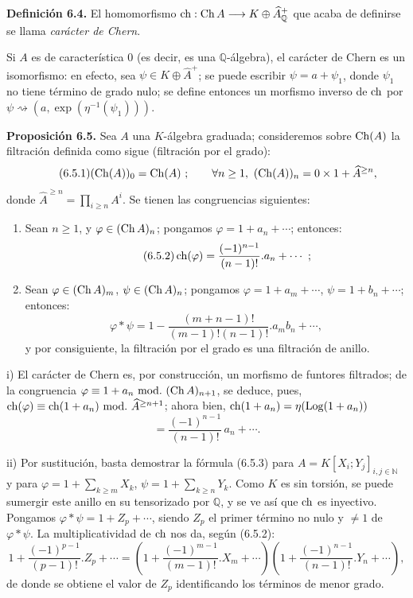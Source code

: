 \textbf{Definición 6.4.} El homomorfismo \(\operatorname{ch}:\operatorname{Ch} A\longrightarrow K\oplus\widehat A_{\mathbb Q}^{+}\) que acaba de definirse se llama \emph{carácter de Chern}.

Si \(A\) es de característica \(0\) (es decir, es una \(\mathbb Q\)-álgebra), el carácter de Chern es un isomorfismo: en efecto, sea \(\psi\in K\oplus\widehat A^+\); se puede escribir \(\psi=a+\psi_1\), donde \(\psi_1\) no tiene término de grado nulo; se define entonces un morfismo inverso de \(\operatorname{ch}\) por \(\psi\rightsquigarrow(a,\exp(\eta^{-1}(\psi_1)))\).

\textbf{Proposición 6.5.} Sea \(A\) una \(K\)-álgebra graduada; consideremos sobre \(\operatorname{Ch}(A)\) la filtración definida como sigue (filtración por el grado):
\begin{equation}\tag{6.5.1}
  (\operatorname{Ch}(A))_0=\operatorname{Ch}(A)~;\qquad
  \forall n\ge1,\ (\operatorname{Ch}(A))_n=0\times 1+\widehat A^{\ge n},
\end{equation}
donde \(\widehat A^{\ge n}=\prod_{i\ge n}A^i\). Se tienen las congruencias siguientes:

\begin{enumerate}[label=\roman*)]
\item Sean \(n\ge1\), y \(\varphi\in(\operatorname{Ch} A)_n\); pongamos \(\varphi=1+a_n+\cdots\); entonces:
\begin{equation}\tag{6.5.2}
  \operatorname{ch}(\varphi)=\frac{(-1)^{n-1}}{(n-1)!}.a_n+\cdots~;
\end{equation}

\item Sean \(\varphi\in(\operatorname{Ch} A)_m\), \(\psi\in(\operatorname{Ch} A)_n\); pongamos
\(\varphi=1+a_m+\cdots\), \(\psi=1+b_n+\cdots\); entonces:
\begin{equation}\tag{6.5.3}
  \varphi*\psi
  =
  1-\frac{(m+n-1)!}{(m-1)!(n-1)!}.a_m b_n+\cdots,
\end{equation}
y por consiguiente, la filtración por el grado es una filtración de anillo.
\end{enumerate}

i) El carácter de Chern es, por construcción, un morfismo de funtores filtrados; de la congruencia \(\varphi\equiv1+a_n\ \mathrm{mod.}\ (\operatorname{Ch} A)_{n+1}\), se deduce, pues, \(\ch(\varphi)\equiv\ch(1+a_n)\ \mathrm{mod.}\ \widehat A^{\ge n+1}\); ahora bien, \(\operatorname{ch}(1+a_n)=\eta(\operatorname{Log}(1+a_n))\)
\[
  =\frac{(-1)^{n-1}}{(n-1)!}\,a_n+\cdots .
\]

ii) Por sustitución, basta demostrar la fórmula (6.5.3) para \(A=K[X_i;Y_j]_{i,j\in\mathbb N}\) y para \(\varphi=1+\sum_{k\ge m}X_k\), \(\psi=1+\sum_{k\ge n}Y_k\). Como \(K\) es sin torsión, se puede sumergir este anillo en su tensorizado por \(\mathbb Q\), y se ve así que \(\operatorname{ch}\) es inyectivo. Pongamos \(\varphi*\psi=1+Z_p+\cdots\), siendo \(Z_p\) el primer término no nulo y \(\neq1\) de \(\varphi*\psi\). La multiplicatividad de \(\operatorname{ch}\) nos da, según (6.5.2):
\[
  1+\frac{(-1)^{p-1}}{(p-1)!}.Z_p+\cdots
  =
  \left(1+\frac{(-1)^{m-1}}{(m-1)!}.X_m+\cdots\right)
  \left(1+\frac{(-1)^{n-1}}{(n-1)!}.Y_n+\cdots\right),
\]
de donde se obtiene el valor de \(Z_p\) identificando los términos de menor grado.

